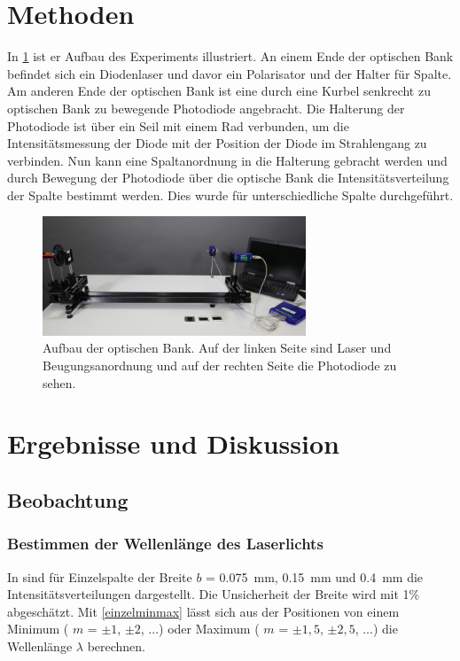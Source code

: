 \documentclass[
	a4paper,
	12pt,
	pagesize,
	ngerman
]{scrartcl}
\begin{document}
	\section{Methoden}
	In \cref{optischeBank} ist er Aufbau des Experiments illustriert.
	An einem Ende der optischen Bank befindet sich ein Diodenlaser und davor ein Polarisator und der Halter für Spalte.
	Am anderen Ende der optischen Bank ist eine durch eine Kurbel senkrecht zu optischen Bank zu bewegende Photodiode angebracht.
	Die Halterung der Photodiode ist über ein Seil mit einem Rad verbunden, um die Intensitätsmessung der Diode mit der Position der Diode im Strahlengang zu verbinden.
	Nun kann eine Spaltanordnung in die Halterung gebracht werden und durch Bewegung der Photodiode über die optische Bank die Intensitätsverteilung der Spalte bestimmt werden.
	Dies wurde für unterschiedliche Spalte durchgeführt. %
	
	\begin{figure}[H]
		\includegraphics[width=0.7\textwidth]{optischeBank}
		\centering
		\caption{Aufbau der optischen Bank. Auf der linken Seite sind Laser und Beugungsanordnung und auf der rechten Seite die Photodiode zu sehen.\cite{optischeBank} }
		\label{optischeBank}
		\centering
	\end{figure} 
	
	\section{Ergebnisse und Diskussion}
	

	\subsection{Beobachtung}
	
	\subsubsection{Bestimmen der Wellenlänge des Laserlichts}
	In  sind für Einzelspalte der Breite $b$ = \SI{0,075}{mm}, \SI{0,15}{mm} und \SI{0,4}{mm} die Intensitätsverteilungen dargestellt. 
	Die Unsicherheit der Breite wird mit 1\% abgeschätzt.
	Mit \cref{einzelminmax} lässt sich aus der Positionen von einem Minimum ( $m$ = $\pm1$, $\pm 2$, ...) oder Maximum ( $m$ = $\pm1,5$, $\pm 2,5$, ...) die Wellenlänge $\lambda$ berechnen. 
	
\end{document}
